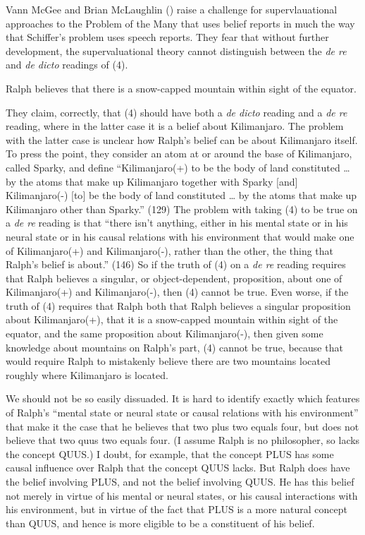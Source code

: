 \documentclass[
  10pt,
  letterpaper,
  DIV=11,
  numbers=noendperiod,
  twoside]{scrartcl}
\providecommand{\tightlist}{%
  \setlength{\itemsep}{0pt}\setlength{\parskip}{0pt}}\usepackage{longtable,booktabs,array}
\begin{document}
Vann McGee and Brian McLaughlin () raise a
challenge for supervlauational approaches to the Problem of the Many
that uses belief reports in much the way that Schiffer's problem uses
speech reports. They fear that without further development, the
supervaluational theory cannot distinguish between the \emph{de re} and
\emph{de dicto} readings of (4).

\begin{description}
\tightlist
\item[(4)]
Ralph believes that there is a snow-capped mountain within sight of the
equator.
\end{description}

They claim, correctly, that (4) should have both a \emph{de dicto}
reading and a \emph{de re} reading, where in the latter case it is a
belief about Kilimanjaro. The problem with the latter case is unclear
how Ralph's belief can be about Kilimanjaro itself. To press the point,
they consider an atom at or around the base of Kilimanjaro, called
Sparky, and define ``Kilimanjaro(+) to be the body of land constituted
\ldots{} by the atoms that make up Kilimanjaro together with Sparky
{[}and{]} Kilimanjaro(-) {[}to{]} be the body of land constituted
\ldots{} by the atoms that make up Kilimanjaro other than Sparky.''
(129) The problem with taking (4) to be true on a \emph{de re} reading
is that ``there isn't anything, either in his mental state or in his
neural state or in his causal relations with his environment that would
make one of Kilimanjaro(+) and Kilimanjaro(-), rather than the other,
the thing that Ralph's belief is about.'' (146) So if the truth of (4)
on a \emph{de re} reading requires that Ralph believes a singular, or
object-dependent, proposition, about one of Kilimanjaro(+) and
Kilimanjaro(-), then (4) cannot be true. Even worse, if the truth of (4)
requires that Ralph both that Ralph believes a singular proposition
about Kilimanjaro(+), that it is a snow-capped mountain within sight of
the equator, and the same proposition about Kilimanjaro(-), then given
some knowledge about mountains on Ralph's part, (4) cannot be true,
because that would require Ralph to mistakenly believe there are two
mountains located roughly where Kilimanjaro is located.

We should not be so easily dissuaded. It is hard to identify exactly
which features of Ralph's ``mental state or neural state or causal
relations with his environment'' that make it the case that he believes
that two plus two equals four, but does not believe that two quus two
equals four. (I assume Ralph is no philosopher, so lacks the concept
QUUS.) I doubt, for example, that the concept PLUS has some causal
influence over Ralph that the concept QUUS lacks. But Ralph does have
the belief involving PLUS, and not the belief involving QUUS. He has
this belief not merely in virtue of his mental or neural states, or his
causal interactions with his environment, but in virtue of the fact that
PLUS is a more natural concept than QUUS, and hence is more eligible to
be a constituent of his belief.
\end{document}
